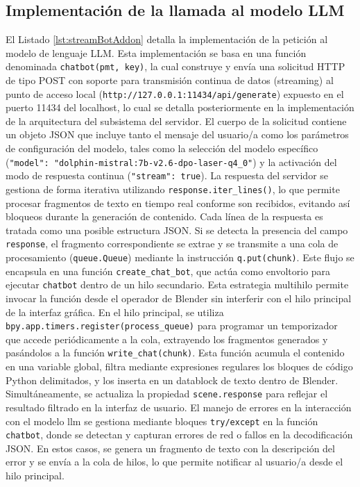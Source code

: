 \subsection{Implementación de la llamada al modelo LLM}

El Listado \ref{lst:streamBotAddon} detalla la implementación de la petición al modelo de lenguaje LLM.
Esta implementación se basa en una función denominada \verb|chatbot(pmt, key)|, la cual construye y envía una solicitud HTTP de tipo POST con soporte para transmisión continua de datos (streaming) al punto de acceso local (\verb|http://127.0.0.1:11434/api/generate|) expuesto en el puerto 11434 del localhost, lo cual se detalla posteriormente en la implementación de la arquitectura del subsistema del servidor. El cuerpo de la solicitud contiene un objeto JSON que incluye tanto el mensaje del usuario/a como los parámetros de configuración del modelo, tales como la selección del modelo específico \\(\verb|"model": "dolphin-mistral:7b-v2.6-dpo-laser-q4_0"|) y la activación del modo de respuesta continua (\verb|"stream": true|). La respuesta del servidor se gestiona de forma iterativa utilizando \verb|response.iter_lines()|, lo que permite procesar fragmentos de texto en tiempo real conforme son recibidos, evitando así bloqueos durante la generación de contenido. Cada línea de la respuesta es tratada como una posible estructura JSON. Si se detecta la presencia del campo \verb|response|, el fragmento correspondiente se extrae y se transmite a una cola de procesamiento (\verb|queue.Queue|) mediante la instrucción \verb|q.put(chunk)|. Este flujo se encapsula en una función \verb|create_chat_bot|, que actúa como envoltorio para ejecutar \verb|chatbot| dentro de un hilo secundario. Esta estrategia multihilo permite invocar la función desde el operador de Blender sin interferir con el hilo principal de la interfaz gráfica.
En el hilo principal, se utiliza \verb|bpy.app.timers.register(process_queue)| para programar un temporizador que accede periódicamente a la cola, extrayendo los fragmentos generados y pasándolos a la función \verb|write_chat(chunk)|. Esta función acumula el contenido en una variable global, filtra mediante expresiones regulares los bloques de código Python delimitados, y los inserta en un datablock de texto dentro de Blender. Simultáneamente, se actualiza la propiedad \verb|scene.response| para reflejar el resultado filtrado en la interfaz de usuario. El manejo de errores en la interacción con el modelo \gls{llm} se gestiona mediante bloques \verb|try/except| en la función \verb|chatbot|, donde se detectan y capturan errores de red o fallos en la decodificación JSON. En estos casos, se genera un fragmento de texto con la descripción del error y se envía a la cola de hilos, lo que permite notificar al usuario/a desde el hilo principal.

